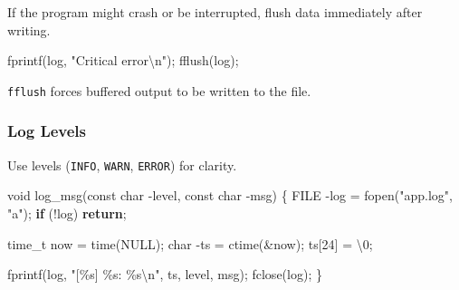 \documentclass[
  letterpaper,
  DIV=11,
  numbers=noendperiod]{scrreprt}
\newenvironment{Shaded}{\begin{snugshade}}{\end{snugshade}}
\newcommand{\CharTok}[1]{\textcolor[rgb]{0.13,0.47,0.30}{#1}}
\newcommand{\ControlFlowTok}[1]{\textcolor[rgb]{0.00,0.23,0.31}{\textbf{#1}}}
\newcommand{\DataTypeTok}[1]{\textcolor[rgb]{0.68,0.00,0.00}{#1}}
\newcommand{\DecValTok}[1]{\textcolor[rgb]{0.68,0.00,0.00}{#1}}
\newcommand{\NormalTok}[1]{\textcolor[rgb]{0.00,0.23,0.31}{#1}}
\newcommand{\OperatorTok}[1]{\textcolor[rgb]{0.37,0.37,0.37}{#1}}
\newcommand{\SpecialCharTok}[1]{\textcolor[rgb]{0.37,0.37,0.37}{#1}}
\newcommand{\StringTok}[1]{\textcolor[rgb]{0.13,0.47,0.30}{#1}}
\begin{document}
If the program might crash or be interrupted, flush data immediately
after writing.

\begin{Shaded}
\begin{Highlighting}[]
\NormalTok{fprintf}\OperatorTok{(}\NormalTok{log}\OperatorTok{,} \StringTok{"Critical error}\SpecialCharTok{\textbackslash{}n}\StringTok{"}\OperatorTok{);}
\NormalTok{fflush}\OperatorTok{(}\NormalTok{log}\OperatorTok{);}
\end{Highlighting}
\end{Shaded}

\texttt{fflush} forces buffered output to be written to the file.

\subsubsection{Log Levels}\label{log-levels}

Use levels (\texttt{INFO}, \texttt{WARN}, \texttt{ERROR}) for clarity.

\begin{Shaded}
\begin{Highlighting}[]
\DataTypeTok{void}\NormalTok{ log\_msg}\OperatorTok{(}\DataTypeTok{const} \DataTypeTok{char} \OperatorTok{{-}}\NormalTok{level}\OperatorTok{,} \DataTypeTok{const} \DataTypeTok{char} \OperatorTok{{-}}\NormalTok{msg}\OperatorTok{)} \OperatorTok{\{}
    \DataTypeTok{FILE} \OperatorTok{{-}}\NormalTok{log }\OperatorTok{=}\NormalTok{ fopen}\OperatorTok{(}\StringTok{"app.log"}\OperatorTok{,} \StringTok{"a"}\OperatorTok{);}
    \ControlFlowTok{if} \OperatorTok{(!}\NormalTok{log}\OperatorTok{)} \ControlFlowTok{return}\OperatorTok{;}

    \DataTypeTok{time\_t}\NormalTok{ now }\OperatorTok{=}\NormalTok{ time}\OperatorTok{(}\NormalTok{NULL}\OperatorTok{);}
    \DataTypeTok{char} \OperatorTok{{-}}\NormalTok{ts }\OperatorTok{=}\NormalTok{ ctime}\OperatorTok{(\&}\NormalTok{now}\OperatorTok{);}\NormalTok{ ts}\OperatorTok{[}\DecValTok{24}\OperatorTok{]} \OperatorTok{=} \CharTok{\textquotesingle{}}\SpecialCharTok{\textbackslash{}0}\CharTok{\textquotesingle{}}\OperatorTok{;}

\NormalTok{    fprintf}\OperatorTok{(}\NormalTok{log}\OperatorTok{,} \StringTok{"[}\SpecialCharTok{\%s}\StringTok{] }\SpecialCharTok{\%s}\StringTok{: }\SpecialCharTok{\%s\textbackslash{}n}\StringTok{"}\OperatorTok{,}\NormalTok{ ts}\OperatorTok{,}\NormalTok{ level}\OperatorTok{,}\NormalTok{ msg}\OperatorTok{);}
\NormalTok{    fclose}\OperatorTok{(}\NormalTok{log}\OperatorTok{);}
\OperatorTok{\}}
\end{Highlighting}
\end{Shaded}
\end{document}
